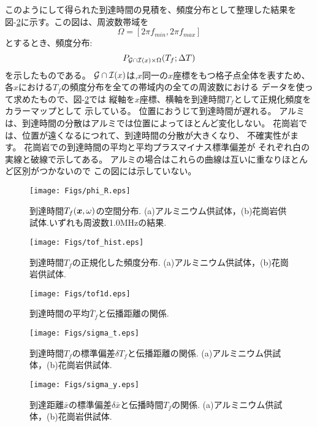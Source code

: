 このようにして得られた到達時間の見積を、頻度分布として整理した結果を
図-\ref{fig:fig11}に示す。この図は、周波数帯域を
\[
	\Omega = \left[ 2\pi f_{min}, 2\pi f_{max} \right]
\]
とするとき、頻度分布:
\begin{equation}
	P_{{\cal G \cap I}(x)\times \Omega }(T_f; \Delta T)
\end{equation}
を示したものである。
${\cal G \cap I}(x)$は,$x$同一の$x$座標をもつ格子点全体を表すため、
各$x$における$T_f$の頻度分布を全ての帯域内の全ての周波数における
データを使って求めたもので、図-\ref{fig:fig11}では
縦軸を$x$座標、横軸を到達時間$T_f$として正規化頻度をカラーマップとして
示している。
位置におうじて到達時間が遅れる。
アルミは、到達時間の分散はアルミでは位置によってほとんど変化しない。
花崗岩では、位置が遠くなるにつれて、到達時間の分散が大きくなり、
不確実性がます。
花崗岩での到達時間の平均と平均プラスマイナス標準偏差が
それぞれ白の実線と破線で示してある。
アルミの場合はこれらの曲線は互いに重なりほとんど区別がつかないので
この図には示していない。
\begin{figure}
\begin{center}
	\texttt{[image: Figs/phi\_R.eps]}
	\caption{到達時間$T_f(\mbox{\boldmath{$x$}},\omega)$の空間分布. 
	(a)アルミニウム供試体，(b)花崗岩供試体.いずれも周波数1.0MHzの結果.}
	\label{fig:fig10}
\end{center}
\end{figure}
\begin{figure}
\begin{center}
	\texttt{[image: Figs/tof\_hist.eps]}
	\caption{到達時間$T_f$の正規化した頻度分布. (a)アルミニウム供試体，(b)花崗岩供試体.}
	\label{fig:fig11}
\end{center}
\end{figure}
\begin{figure}
\begin{center}
	\texttt{[image: Figs/tof1d.eps]}
	\caption{到達時間の平均$\bar T_f$と伝播距離の関係. }
	\label{fig:fig12}
\end{center}
\end{figure}
\begin{figure}
\begin{center}
	\texttt{[image: Figs/sigma\_t.eps]}
	\caption{到達時間$T_f$の標準偏差$\delta T_f$と伝播距離の関係. (a)アルミニウム供試体，(b)花崗岩供試体.}
	\label{fig:fig13}
\end{center}
\end{figure}
\begin{figure}
\begin{center}
	\texttt{[image: Figs/sigma\_y.eps]}
	\caption{到達距離$\bar{x}$の標準偏差$\delta \bar{x}$と伝播時間$T_f$の関係. (a)アルミニウム供試体，(b)花崗岩供試体.}
	\label{fig:fig14}
\end{center}
\end{figure}
